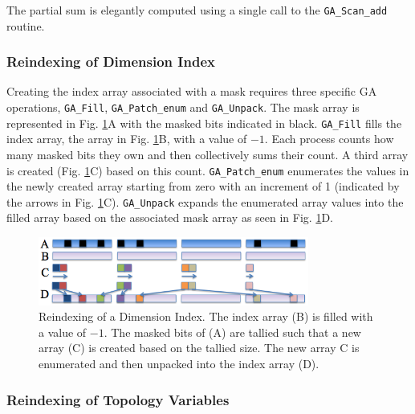 
The partial sum is elegantly computed using a single call to the
\verb+GA_Scan_add+ routine.

\subsubsection{Reindexing of Dimension Index}

Creating the index array associated with a mask requires three specific GA
operations, \verb=GA_Fill=, \verb=GA_Patch_enum= and \verb=GA_Unpack=.  The
mask array is represented in Fig. \ref{fig:unpack}A with the masked bits
indicated in black.  \verb=GA_Fill= fills the index array, the array in Fig.
\ref{fig:unpack}B, with a value of $-1$.  Each process counts how many masked
bits they own and then collectively sums their count.  A third array is
created (Fig. \ref{fig:unpack}C) based on this count.  \verb=GA_Patch_enum=
enumerates the values in the newly created array starting from zero with an
increment of 1 (indicated by the arrows in Fig. \ref{fig:unpack}C).
\verb=GA_Unpack= expands the enumerated array values into the filled array
based on the associated mask array as seen in Fig. \ref{fig:unpack}D.

\begin{figure}[!t]
\center
\includegraphics[width=3.5in]{images/unpack}
\caption{Reindexing of a Dimension Index.  The index array (B) is filled with
a value of $-1$.  The masked bits of (A) are tallied such that a new array (C)
is created based on the tallied size.  The new array C is enumerated and then
unpacked into the index array (D).}
\label{fig:unpack}
\end{figure}

\subsubsection{Reindexing of Topology Variables}


